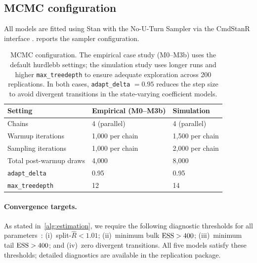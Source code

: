 
\subsection{MCMC configuration}
\label{sme:mcmc}

All models are fitted using Stan
\citep{CarpenterEtAl2017} with the No-U-Turn Sampler
\citep[NUTS;][]{Hoffman2014} via the \textsf{CmdStanR} interface
\citep{CmdStanR2024}.   reports the sampler
configuration.

\begin{table}[htbp]
  \centering
  \begin{tabular}{@{}l ll@{}}
    \toprule
    Setting & Empirical (M0--M3b) & Simulation \\
    \midrule
    Chains                  & 4 (parallel) & 4 (parallel) \\
    Warmup iterations       & 1{,}000 per chain & 1{,}500 per chain \\
    Sampling iterations     & 1{,}000 per chain & 2{,}000 per chain \\
    Total post-warmup draws & 4{,}000 & 8{,}000 \\
    \texttt{adapt\_delta}    & 0.95 & 0.95 \\
    \texttt{max\_treedepth}  & 12 & 14 \\
    \bottomrule
  \end{tabular}
  \caption{MCMC configuration.  The empirical case study (M0--M3b)
    uses the default \textsf{hurdlebb} settings; the simulation study
    uses longer runs and higher \texttt{max\_treedepth} to ensure
    adequate exploration across 200 replications.  In both cases,
    \texttt{adapt\_delta} $= 0.95$ reduces the step size to avoid
    divergent transitions in the state-varying coefficient models.}
  \label{sme:tab-mcmc}
\end{table}

\paragraph{Convergence targets.}
As stated in~\cref{alg:estimation}, we require the following
diagnostic thresholds for all parameters~\citep{Vehtari2021}:
(i)~split-$\hat{R} < 1.01$;
(ii)~minimum bulk $\text{ESS} > 400$;
(iii)~minimum tail $\text{ESS} > 400$; and
(iv)~zero divergent transitions.
All five models satisfy these thresholds; detailed diagnostics
are available in the replication package.

